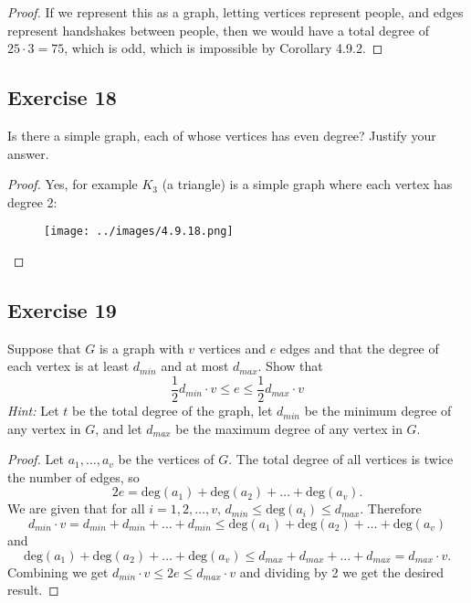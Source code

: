 \documentclass[14pt]{extarticle}
\begin{document}
\begin{proof}
    If we represent this as a graph, letting vertices represent people, and edges represent handshakes between people, then we would have a total degree of $25 \cdot 3 = 75$, which is odd, which is impossible by Corollary 4.9.2.
\end{proof}

\subsection{Exercise 18}
Is there a simple graph, each of whose vertices has even degree? Justify your answer.

\begin{proof}
    Yes, for example $K_3$ (a triangle) is a simple graph where each vertex has degree 2:
    \begin{figure}[ht!]
        \centering
        \texttt{[image: ../images/4.9.18.png]}
    \end{figure}
\end{proof}

\subsection{Exercise 19}
Suppose that $G$ is a graph with $v$ vertices and $e$ edges and that the degree of each vertex is at least $d_{min}$ and at most $d_{max}$. Show that
\[
    \frac{1}{2}d_{min}\cdot v \leq e \leq \frac{1}{2}d_{max}\cdot v
\]
{\it Hint:} Let $t$ be the total degree of the graph, let $d_{min}$ be the minimum degree of any vertex in $G$, and let $d_{max}$ be the maximum degree of any vertex in $G$.

\begin{proof}
    Let $a_1, \ldots, a_v$ be the vertices of $G$. The total degree of all vertices is twice the number of edges, so
    \[
        2e = \text{deg}(a_1) + \text{deg}(a_2) + \ldots + \text{deg}(a_v).
    \]
    We are given that for all $i = 1, 2, \ldots, v$, $d_{min} \leq \text{deg}(a_i) \leq d_{max}$. Therefore
    \[
        d_{min} \cdot v = d_{min} + d_{min} + \ldots + d_{min} \leq \text{deg}(a_1) + \text{deg}(a_2) + \ldots + \text{deg}(a_v)
    \]
    and
    \[
        \text{deg}(a_1) + \text{deg}(a_2) + \ldots + \text{deg}(a_v) \leq d_{max} + d_{max} + \ldots + d_{max} = d_{max} \cdot v.
    \]
    Combining we get $d_{min} \cdot v \leq 2e \leq d_{max} \cdot v$ and dividing by 2 we get the desired result.
\end{proof}
\end{document}
